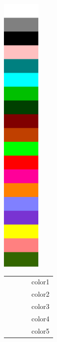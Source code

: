 \begin{figure}[!h]
	\noindent
	\begin{minipage}{0.5\textwidth}	
		\hfill
		\includegraphics[height=14.1cm]{colorbar.png}%
		\hspace{1cm}
	\end{minipage}%
	\hfill%
	\begin{minipage}{0.5\textwidth}
		\begin{tabular}{p{1.5cm} p{1cm} p{1.5cm} p{1cm}}
          \cellcolor[rgb]{1.00000,1.00000,1.00000}{~} & ~ & \cellcolor[cmyk]{0.00000,0.00060,0.00027,0.00014}{~} & {color1} \\
          \cellcolor[rgb]{0.50196,0.50196,0.50196}{~} & ~ & \cellcolor[cmyk]{0.24808,0.20929,0.19661,0.36100}{~} & {color2} \\
          \cellcolor[rgb]{0.00000,0.00000,0.00000}{~} & ~ & \cellcolor[cmyk]{0.00000,0.00000,0.00000,0.99997}{~} & {color3} \\
          \cellcolor[rgb]{1.00000,0.75294,0.75294}{~} & ~ & \cellcolor[cmyk]{0.00482,0.36851,0.22217,0.00104}{~} & {color4} \\
          \cellcolor[rgb]{0.00000,0.50196,0.50196}{~} & ~ & \cellcolor[cmyk]{0.83091,0.21785,0.40542,0.07037}{~} & {color5} \\

\end{tabular}
\end{minipage}
\end{figure}
